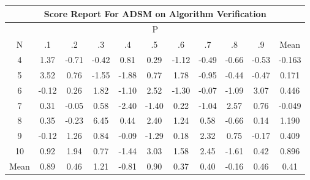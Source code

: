 \documentclass[11pt,a4paper]{report}
\begin{document}
\begin{longtable}{ | c || c | c | c | c | c | c | c | c | c || c |}
\hline
\multicolumn{11}{|c|}{ Score Report For ADSM on Algorithm Verification} \\
\hline
\multicolumn{11}{|c|}{ P } \\
\hline
N & .1 & .2 & .3 & .4 & .5 & .6 & .7 & .8 & .9 & Mean\\
 \hline
 \hline
 \endhead
  4 &  \cellcolor[HTML]{DFDFFF} 1.37 &  \cellcolor[HTML]{FFEFEF} -0.71 &  \cellcolor[HTML]{FFF7F7} -0.42 &  \cellcolor[HTML]{E7E7FF} 0.81 &  \cellcolor[HTML]{F7F7FF} 0.29 &  \cellcolor[HTML]{FFDFDF} -1.12 &  \cellcolor[HTML]{FFEFEF} -0.49 &  \cellcolor[HTML]{FFEFEF} -0.66 &  \cellcolor[HTML]{FFEFEF} -0.53 & -0.163 \\
  5 &  \cellcolor[HTML]{A7A7FF} 3.52 &  \cellcolor[HTML]{EFEFFF} 0.76 &  \cellcolor[HTML]{FFD7D7} -1.55 &  \cellcolor[HTML]{FFCFCF} -1.88 &  \cellcolor[HTML]{EFEFFF} 0.77 &  \cellcolor[HTML]{CFCFFF} 1.78 &  \cellcolor[HTML]{FFE7E7} -0.95 &  \cellcolor[HTML]{FFF7F7} -0.44 &  \cellcolor[HTML]{FFF7F7} -0.47 & 0.171 \\
  6 &  \cellcolor[HTML]{FFFFFF} -0.12 &  \cellcolor[HTML]{F7F7FF} 0.26 &  \cellcolor[HTML]{CFCFFF} 1.82 &  \cellcolor[HTML]{FFE7E7} -1.10 &  \cellcolor[HTML]{BFBFFF} 2.52 &  \cellcolor[HTML]{FFDFDF} -1.30 &  \cellcolor[HTML]{FFFFFF} -0.07 &  \cellcolor[HTML]{FFE7E7} -1.09 &  \cellcolor[HTML]{AFAFFF} 3.07 & 0.446 \\
  7 &  \cellcolor[HTML]{F7F7FF} 0.31 &  \cellcolor[HTML]{FFFFFF} -0.05 &  \cellcolor[HTML]{EFEFFF} 0.58 &  \cellcolor[HTML]{FFBFBF} -2.40 &  \cellcolor[HTML]{FFDFDF} -1.40 &  \cellcolor[HTML]{F7F7FF} 0.22 &  \cellcolor[HTML]{FFE7E7} -1.04 &  \cellcolor[HTML]{BFBFFF} 2.57 &  \cellcolor[HTML]{EFEFFF} 0.76 & -0.049 \\
  8 &  \cellcolor[HTML]{F7F7FF} 0.35 &  \cellcolor[HTML]{FFF7F7} -0.23 &  \cellcolor[HTML]{6060FF} 6.45 &  \cellcolor[HTML]{F7F7FF} 0.44 &  \cellcolor[HTML]{BFBFFF} 2.40 &  \cellcolor[HTML]{DFDFFF} 1.24 &  \cellcolor[HTML]{EFEFFF} 0.58 &  \cellcolor[HTML]{FFEFEF} -0.66 &  \cellcolor[HTML]{FFFFFF} 0.14 & 1.190 \\
  9 &  \cellcolor[HTML]{FFFFFF} -0.12 &  \cellcolor[HTML]{DFDFFF} 1.26 &  \cellcolor[HTML]{E7E7FF} 0.84 &  \cellcolor[HTML]{FFFFFF} -0.09 &  \cellcolor[HTML]{FFDFDF} -1.29 &  \cellcolor[HTML]{F7F7FF} 0.18 &  \cellcolor[HTML]{C7C7FF} 2.32 &  \cellcolor[HTML]{EFEFFF} 0.75 &  \cellcolor[HTML]{FFF7F7} -0.17 & 0.409 \\
  10 &  \cellcolor[HTML]{E7E7FF} 0.92 &  \cellcolor[HTML]{CFCFFF} 1.94 &  \cellcolor[HTML]{EFEFFF} 0.77 &  \cellcolor[HTML]{FFD7D7} -1.44 &  \cellcolor[HTML]{AFAFFF} 3.03 &  \cellcolor[HTML]{D7D7FF} 1.58 &  \cellcolor[HTML]{BFBFFF} 2.45 &  \cellcolor[HTML]{FFD7D7} -1.61 &  \cellcolor[HTML]{F7F7FF} 0.42 & 0.896 \\
 \hline
 \hline
Mean &  \cellcolor[HTML]{E7E7FF} 0.89 &  \cellcolor[HTML]{F7F7FF} 0.46 &  \cellcolor[HTML]{DFDFFF} 1.21 &  \cellcolor[HTML]{FFE7E7} -0.81 &  \cellcolor[HTML]{E7E7FF} 0.90 &  \cellcolor[HTML]{F7F7FF} 0.37 &  \cellcolor[HTML]{F7F7FF} 0.40 &  \cellcolor[HTML]{FFF7F7} -0.16 &  \cellcolor[HTML]{F7F7FF} 0.46 &  \cellcolor[HTML]{F7F7FF} 0.41
\end{longtable}
\end{document}
